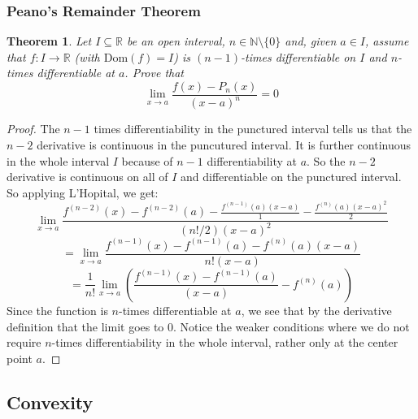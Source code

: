 \documentclass[10pt,letterpaper]{article} %
\newtheorem{thm}{Theorem}[section]
\begin{document}
\subsubsection{Peano's Remainder Theorem}
\begin{thm}
Let $I \subseteq \mathbb{R}$ be an open interval, $n \in \mathbb{N}\setminus \{0\}$ and, given $a \in I$, assume that $f: I \xrightarrow{} \mathbb{R}$ (with $\text{Dom}(f) = I$) is $(n-1)$-times differentiable on $I$ and $n$-times differentiable at $a$. Prove that
\begin{equation*}
\lim_{x \xrightarrow{} a}\frac{f(x) - P_n(x)}{(x-a)^n} = 0
\end{equation*} 
\end{thm}
\begin{proof}
The $n-1$ times differentiability in the punctured interval tells us that the $n-2$ derivative is continuous in the puncutured interval. It is further continuous in the whole interval $I$ because of $n-1$ differentiability at $a$. So the $n-2$ derivative is continuous on all of $I$ and differentiable on the punctured interval. So applying L'Hopital, we get:
\begin{equation*}
\lim_{x \xrightarrow{} a}\frac{f^{(n-2)}(x) - f^{(n-2)}(a) - \frac{f^{(n-1)}(a)(x-a)}{1} - \frac{f^{(n)}(a)(x-a)^2}{2}}{(n!/2)(x-a)^2}
\end{equation*}
\begin{equation*}
= \lim_{x \xrightarrow{} a}\frac{f^{(n-1)}(x) - f^{(n-1)}(a) - f^{(n)}(a)(x-a)}{n!(x-a)}
\end{equation*}
\begin{equation*}
= \frac{1}{n!}\lim_{x \xrightarrow{} a}\left(\frac{f^{(n-1)}(x) - f^{(n-1)}(a)}{(x-a)} - f^{(n)}(a)\right)
\end{equation*}
Since the function is $n$-times differentiable at $a$, we see that by the derivative definition that the limit goes to $0$. Notice the weaker conditions where we do not require $n$-times differentiability in the whole interval, rather only at the center point $a$.
\end{proof}

\subsection{Convexity}
\end{document}
